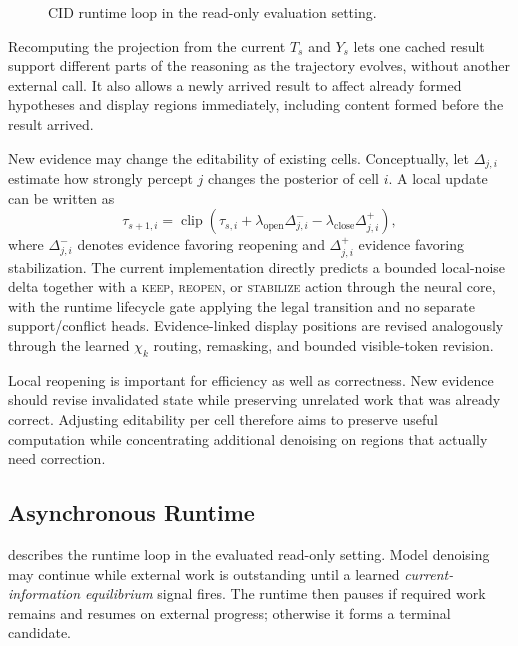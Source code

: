 \begin{figure}[t]
  \centering
  
  \caption{CID runtime loop in the read-only evaluation setting.}
  \label{fig:cid-runtime}
\end{figure}

Recomputing the projection from the current $T_s$ and $Y_s$ lets one cached result support different parts of the reasoning as the trajectory evolves, without another external call. It also allows a newly arrived result to affect already formed hypotheses and display regions immediately, including content formed before the result arrived.

New evidence may change the editability of existing cells. Conceptually, let $\Delta_{j,i}$ estimate how strongly percept $j$ changes the posterior of cell $i$. A local update can be written as
\begin{equation}
  \tau_{s+1,i} = \operatorname{clip}
  \left(\tau_{s,i} + \lambda_{\mathrm{open}}\Delta^-_{j,i}
  - \lambda_{\mathrm{close}}\Delta^+_{j,i}\right),
  \label{eq:local-noise-update}
\end{equation}
where $\Delta^-_{j,i}$ denotes evidence favoring reopening and $\Delta^+_{j,i}$ evidence favoring stabilization. The current implementation directly predicts a bounded local-noise delta together with a \textsc{keep}, \textsc{reopen}, or \textsc{stabilize} action through the neural core, with the runtime lifecycle gate applying the legal transition and no separate support/conflict heads. Evidence-linked display positions are revised analogously through the learned $\chi_k$ routing, remasking, and bounded visible-token revision.

Local reopening is important for efficiency as well as correctness. New evidence should revise invalidated state while preserving unrelated work that was already correct. Adjusting editability per cell therefore aims to preserve useful computation while concentrating additional denoising on regions that actually need correction.

\subsection{Asynchronous Runtime}
\label{sec:runtime}

 describes the runtime loop in the evaluated read-only setting. Model denoising may continue while external work is outstanding until a learned \emph{current-information equilibrium} signal fires. The runtime then pauses if required work remains and resumes on external progress; otherwise it forms a terminal candidate.

